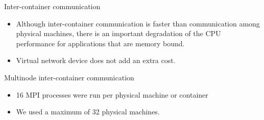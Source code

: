 \documentclass[presentation]{beamer}
\begin{document}
\begin{frame}[label=sec-3-6]{Inter-container communication}
\begin{itemize}
\item Although inter-container communication is faster
than communication among physical machines, there is an important degradation
of the CPU performance for applications that are memory bound.

\item Virtual network device does not add an extra cost.
\end{itemize}
\end{frame}

\begin{frame}[label=sec-3-7]{Multinode inter-container communication}
\begin{itemize}
\item 16 MPI processes were run per physical machine or container
\item We used a maximum of 32 physical machines.
\end{itemize}


\end{frame}
\end{document}
